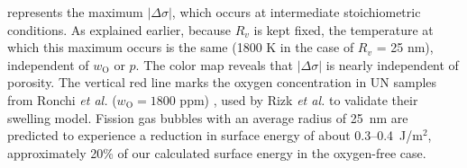 \documentclass[preprint,12pt,sort&compress]{elsarticle}
\newcommand{\?}{\stackrel{?}{=}}
\begin{document}
 represents the maximum $|\Delta \sigma|$, which occurs at intermediate stoichiometric conditions. As explained earlier, because $R_v$ is kept fixed, the temperature at which this maximum occurs is the same (1800 K in the case of $R_v$ = 25 nm), independent of $w_\text{O}$ or $p$. The color map reveals that $|\Delta \sigma|$ is nearly independent of porosity. The vertical red line marks the oxygen concentration in UN samples from Ronchi \textit{et al.} ($w_\text{O} = 1800$ ppm) \cite{Ronchi1975,Ronchi1978}, used by Rizk \textit{et al.} \cite{Rizk2025} to validate their swelling model. Fission gas bubbles with an average radius of 25~nm are predicted to experience a reduction in surface energy of about 0.3--0.4~J/m$^2$, approximately 20\% of our calculated surface energy in the oxygen-free case.

\end{document}
